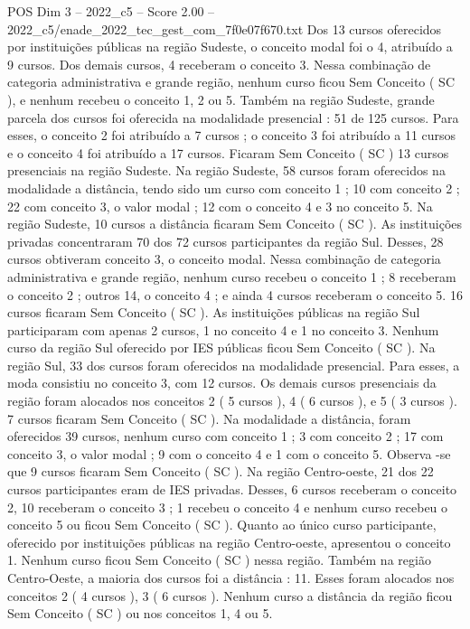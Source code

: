 \begin{textsample}{POS Dim 3 – 2022\_c5 – Score 2.00 – 2022\_c5/enade\_2022\_tec\_gest\_com\_7f0e07f670.txt}
Dos 13 cursos oferecidos por instituições públicas na região Sudeste, o conceito modal foi o 4, atribuído a 9 cursos.
Dos demais cursos, 4 receberam o conceito 3.
Nessa combinação de categoria administrativa e grande região, nenhum curso ficou Sem Conceito ( SC ), e nenhum recebeu o conceito 1, 2 ou 5.
Também na região Sudeste, grande parcela dos cursos foi oferecida na modalidade presencial : 51 de 125 cursos.
Para esses, o conceito 2 foi atribuído a 7 cursos ; o conceito 3 foi atribuído a 11 cursos e o conceito 4 foi atribuído a 17 cursos.
Ficaram Sem Conceito ( SC ) 13 cursos presenciais na região Sudeste.
Na região Sudeste, 58 cursos foram oferecidos na modalidade a distância, tendo sido um curso com conceito 1 ; 10 com conceito 2 ; 22 com conceito 3, o valor modal ; 12 com o conceito 4 e 3 no conceito 5.
Na região Sudeste, 10 cursos a distância ficaram Sem Conceito ( SC ).
As instituições privadas concentraram 70 dos 72 cursos participantes da região Sul.
Desses, 28 cursos obtiveram conceito 3, o conceito modal.
Nessa combinação de categoria administrativa e grande região, nenhum curso recebeu o conceito 1 ; 8 receberam o conceito 2 ; outros 14, o conceito 4 ; e ainda 4 cursos receberam o conceito 5. 16 cursos ficaram Sem Conceito ( SC ).
As instituições públicas na região Sul participaram com apenas 2 cursos, 1 no conceito 4 e 1 no conceito 3.
Nenhum curso da região Sul oferecido por IES públicas ficou Sem Conceito ( SC ).
Na região Sul, 33 dos cursos foram oferecidos na modalidade presencial.
Para esses, a moda consistiu no conceito 3, com 12 cursos.
Os demais cursos presenciais da região foram alocados nos conceitos 2 ( 5 cursos ), 4 ( 6 cursos ), e 5 ( 3 cursos ). 7 cursos ficaram Sem Conceito ( SC ).
Na modalidade a distância, foram oferecidos 39 cursos, nenhum curso com conceito 1 ; 3 com conceito 2 ; 17 com conceito 3, o valor modal ; 9 com o conceito 4 e 1 com o conceito 5.
Observa -se que 9 cursos ficaram Sem Conceito ( SC ).
Na região Centro-oeste, 21 dos 22 cursos participantes eram de IES privadas.
Desses, 6 cursos receberam o conceito 2, 10 receberam o conceito 3 ; 1 recebeu o conceito 4 e nenhum curso recebeu o conceito 5 ou ficou Sem Conceito ( SC ).
Quanto ao único curso participante, oferecido por instituições públicas na região Centro-oeste, apresentou o conceito 1.
Nenhum curso ficou Sem Conceito ( SC ) nessa região.
Também na região Centro-Oeste, a maioria dos cursos foi a distância : 11.
Esses foram alocados nos conceitos 2 ( 4 cursos ), 3 ( 6 cursos ).
Nenhum curso a distância da região ficou Sem Conceito ( SC ) ou nos conceitos 1, 4 ou 5.

\end{textsample}
